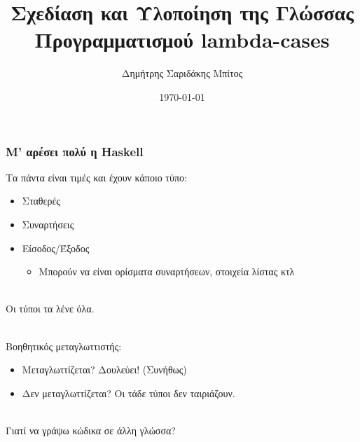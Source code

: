 \documentclass{beamer}
\date{\today}
\author{Δημήτρης Σαριδάκης Μπίτος}
\institute{Εθνικό Μετσόβιο Πολυτεχνείο}
\def\e{\foreignlanguage{english}}
\def\h{\e{Haskell}}
\begin{document}
\title{Σχεδίαση και Υλοποίηση της Γλώσσας Προγραμματισμού \e{lambda-cases}}
\frame{\titlepage}

\begin{frame}

\frametitle{Μ' αρέσει πολύ η \h}

Τα πάντα είναι τιμές και έχουν κάποιο τύπο:

\begin{itemize}

\item Σταθερές
\item Συναρτήσεις
\item Είσοδος/Έξοδος

\begin{itemize}

\item Μπορούν να είναι ορίσματα συναρτήσεων, στοιχεία λίστας κτλ
\\~\
\end{itemize}

\end{itemize}

Οι τύποι τα λένε όλα.
\\~\

Βοηθητικός μεταγλωττιστής:

\begin{itemize}

\item Μεταγλωττίζεται? Δουλεύει! (Συνήθως)

\item Δεν μεταγλωττίζεται? Οι τάδε τύποι δεν ταιριάζουν.
\\~\

\end{itemize}

Γιατί να γράψω κώδικα σε άλλη γλώσσα?

\end{frame}
\end{document}
